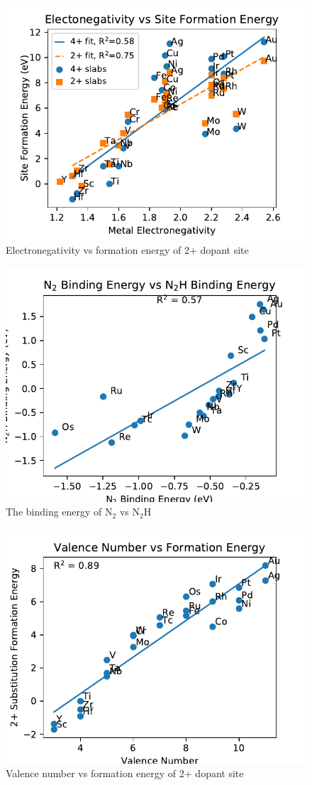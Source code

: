 \begin{figure}
\centering
\includegraphics[width=0.8\linewidth]{Images/electronegativity_vs_formation.pdf}
\caption{Electronegativity vs formation energy of 2+ dopant site}
\end{figure}

\begin{figure}
\centering
\includegraphics[width=0.8\linewidth]{Images/N2_vs_N2H.pdf}
\caption{The binding energy of N$_2$ vs N$_2$H}
\end{figure}

\begin{figure}
\centering
\includegraphics[width=0.8\linewidth]{Images/Valence_vs_formation_energy.pdf}
\caption{Valence number vs formation energy of 2+ dopant site}
\end{figure}

